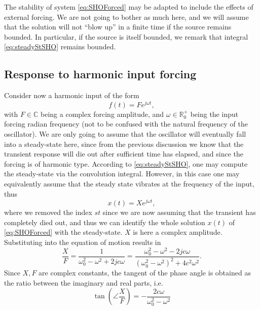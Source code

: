 \documentclass[11pt,twoside,a4paper,english]{book}
\newcommand{\virg}[1]{``#1''}
\begin{document}
The stability of system \eqref{eq:SHOForced} may be adapted to include the effects of external forcing. We are not going to bother as much here, and we will assume that the solution will not \virg{blow up} in a finite time if the source remains bounded. 
In particular, if the source is itself bounded, we remark that integral \eqref{eq:steadyStSHO} remains bounded. 





\subsection{Response to harmonic input forcing}

Consider now a harmonic input of the form
\begin{equation}\label{eq:harmoForceLinear}
    f(t) = F e^{j\omega t},
\end{equation}
with $F \in \mathbb{C}$ being a complex forcing amplitude, and $\omega \in \mathbb{R}^+_0$ being the input forcing radian frequency (not to be confused with the natural frequency of the oscillator). We are only going to assume that the oscillator will eventually fall into a steady-state here, since from the previous discussion we know that the transient response will die out after sufficient time has elapsed, and since the forcing is of harmonic type. According to \eqref{eq:steadyStSHO}, one may compute the steady-state via the convolution integral. However, in this case one may equivalently assume that the steady state vibrates at the frequency of the input, thus
\begin{equation}
    x(t) = X e^{j\omega t},
\end{equation}
where we removed the index $st$ since we are now assuming that the transient has completely died out, and thus we can identify the whole solution $x(t)$ of \eqref{eq:SHOForced} with the steady-state. $X$ is here a complex amplitude. Substituting into the equation of motion results in
\begin{equation}\label{eq:TransXF}
    \frac{X}{F} = \frac{1}{\omega_0^2-\omega^2+2jc\omega} =  \frac{\omega_0^2-\omega^2-2jc\omega}{(\omega_0^2-\omega^2)^2+4c^2\omega^2}.
\end{equation}
Since $X,F$ are complex constants, the tangent of the phase angle  is obtained as the ratio between the imaginary and real parts, i.e. 
\begin{equation}
    \tan \left(\angle \frac{X}{F}\right) = -\frac{2c\omega}{\omega_0^2 - \omega^2}
\end{equation}
\end{document}

